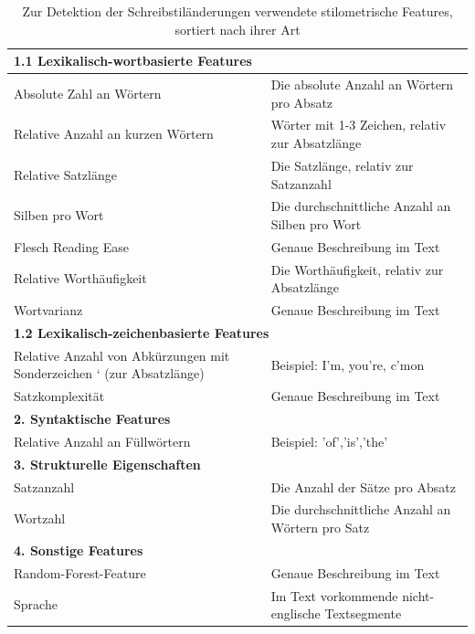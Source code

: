 \documentclass[conference]{IEEEtran}
\begin{document}
	\begin{table}[htbp]
		\caption{ Zur Detektion der Schreibstiländerungen verwendete stilometrische Features, sortiert nach ihrer Art}
		\begin{center}
			\begin{tabular}{|p{4cm}|p{3cm}|}
				\hline
				\multicolumn{2}{|l|}{\textbf{1.1 Lexikalisch-wortbasierte Features}} \\
				\hline 
				Absolute Zahl an Wörtern & Die absolute Anzahl an Wörtern pro Absatz \\
				\hline
				Relative Anzahl an kurzen Wörtern  & Wörter mit 1-3 Zeichen, relativ zur Absatzlänge \\
				\hline 
				Relative Satzlänge & Die Satzlänge, relativ zur Satzanzahl \\
				\hline
				Silben pro Wort \cite{silben} & Die durchschnittliche Anzahl an Silben pro Wort \\
				\hline
				Flesch Reading Ease & Genaue Beschreibung im Text\\
				\hline
				Relative Worthäufigkeit & Die Worthäufigkeit, relativ zur Absatzlänge \\
				\hline
				Wortvarianz & Genaue Beschreibung im Text\\
				\hline
				\multicolumn{2}{|l|}{\textbf{1.2 Lexikalisch-zeichenbasierte Features}} \\
				\hline
				Relative Anzahl von Abkürzungen mit Sonderzeichen ‘ (zur Absatzlänge) & Beispiel: I’m, you’re, c’mon \\
				\hline
				Satzkomplexität & Genaue Beschreibung im Text \\
				\hline
				\multicolumn{2}{|l|}{\textbf{2. Syntaktische Features}} \\
				\hline
				Relative Anzahl an Füllwörtern & Beispiel: 'of','is','the' \\
				\hline
				\multicolumn{2}{|l|}{\textbf{3. Strukturelle Eigenschaften}} \\
				\hline
				Satzanzahl & Die Anzahl der Sätze pro Absatz \\
				\hline 
				Wortzahl & Die durchschnittliche Anzahl an Wörtern pro Satz \\
				\hline
				\multicolumn{2}{|l|}{\textbf{4. Sonstige Features}} \\
				\hline
				Random-Forest-Feature & Genaue Beschreibung im Text \\
				\hline
				Sprache \cite{mf_b6} & Im Text vorkommende nicht-englische Textsegmente \\
				\hline
			\end{tabular}
			\label{tab:features}
		\end{center}
	\end{table}
\end{document}
